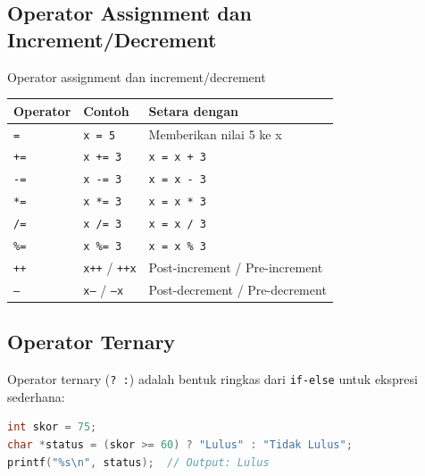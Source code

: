 \documentclass[../main.tex]{subfiles}
\begin{document}
\subsection{Operator Assignment dan Increment/Decrement}

\begin{modultable}[]{Operator assignment dan increment/decrement}
\begin{tabular}{|l|l|l|}
\hline
\textbf{Operator} & \textbf{Contoh} & \textbf{Setara dengan} \\
\hline
\texttt{=} & \texttt{x = 5} & Memberikan nilai 5 ke x \\
\hline
\texttt{+=} & \texttt{x += 3} & \texttt{x = x + 3} \\
\hline
\texttt{-=} & \texttt{x -= 3} & \texttt{x = x - 3} \\
\hline
\texttt{*=} & \texttt{x *= 3} & \texttt{x = x * 3} \\
\hline
\texttt{/=} & \texttt{x /= 3} & \texttt{x = x / 3} \\
\hline
\texttt{\%=} & \texttt{x \%= 3} & \texttt{x = x \% 3} \\
\hline
\texttt{++} & \texttt{x++} / \texttt{++x} & Post-increment / Pre-increment \\
\hline
\texttt{--} & \texttt{x--} / \texttt{--x} & Post-decrement / Pre-decrement \\
\hline
\end{tabular}
\end{modultable}





\subsection{Operator Ternary}

Operator ternary (\texttt{? :}) adalah bentuk ringkas dari \texttt{if-else} untuk ekspresi sederhana:

\begin{lstlisting}[language=C,caption=Operator ternary]
int skor = 75;
char *status = (skor >= 60) ? "Lulus" : "Tidak Lulus";
printf("%s\n", status);  // Output: Lulus
\end{lstlisting}
\end{document}
